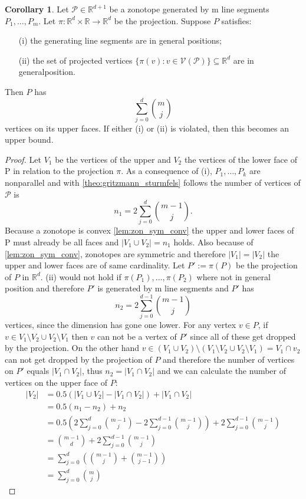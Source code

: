 \documentclass{article}
\theoremstyle{definition}
\newtheorem{corollary}[theorem]{Corollary}
\begin{document}
\begin{corollary}\hspace{1sp}\cite[p.~4]{zhang2018tropical}
\label{cor:zon_lines}
Let $\mathcal{P} \in \mathbb{R}^{d+1}$ be a zonotope generated by m line segments $P_1 , \dots , P_m$. Let $\pi : \mathbb{R}^{d} \times \mathbb{R} \to \mathbb{R}^{d}$ be the projection. Suppose $P$ satisfies:
\begin{itemize}
\item[(i)]
the generating line segments are in general positions;
\item[(ii)]
the set of projected vertices $\{ \pi(v) : v \in \mathcal{V}(\mathcal{P}) \} \subseteq \mathbb{R}^{d}$ are in generalposition.
\end{itemize}
Then $P$ has
$$ \sum_{j=0}^{d} \binom{m}{j} $$
vertices on its upper faces. If either (i) or (ii) is violated, then this becomes an upper bound.
\end{corollary}
\begin{proof}
Let $V_{1}$ be the vertices of the upper and $V_{2}$ the vertices of the lower face of P in relation to the projection $\pi$. As a consequence of (i), $P_{1}, \dots , P_{k}$ are nonparallel and with \ref{theo:gritzmann_sturmfels} follows the number of vertices of $\mathcal{P}$ is 
$$n_{1} = 2 \sum^{d}_{j=0} \binom{m-1}{j}.$$ 
Because a zonotope is convex \ref{lem:zon_sym_conv} the upper and lower faces of P must already be all faces and $|V_{1} \cup V_{2}| = n_{1}$ holds. Also because of \ref{lem:zon_sym_conv}, zonotopes are symmetric and therefore $|V_{1}| = |V_{2}|$ the upper and lower faces are of same cardinality. Let $P' := \pi (P)$ be the projection of $P$ in $\mathbb{R}^{d}$. (ii) would not hold if $\pi(P_{1}), \dots , \pi(P_{2})$ where not in general position and therefore $P'$ is generated by m line segments and $P'$ has 
$$n_{2}=2 \sum^{d-1}_{j=0} \binom{m-1}{j}$$
vertices, since the dimension has gone one lower. For any vertex $v \in P$, if $v \in V_{1} \setminus V_{2} \cup V_{2} \setminus V_{1}$ then $v$ can not be a vertex of $P'$ since all of these get dropped by the projection. On the other hand $v \in (V_{1} \cup V_{2}) \setminus (V_{1} \setminus V_{2} \cup V_{2} \setminus V_{1}) = V_{1} \cap v_{2}$ can not get dropped by the projection of $P$ and therefore the number of vertices on $P'$ equals $|V_{1} \cap V_{2}|$, thus $n_{2} = |V_{1} \cap V_{2}|$ and we can calculate the number of vertices on the upper face of $P$:
\begin{align*}
|V_{2}|
&= 0.5(|V_{1} \cup V_{2}| - |V_{1} \cap V_{2}|) + |V_{1} \cap V_{2}| \\
&= 0.5(n_{1} - n_{2}) + n_{2} \\
&= 0.5(2 \sum^{d}_{j=0} \binom{m-1}{j} - 2 \sum^{d-1}_{j=0} \binom{m-1}{j}) + 2 \sum^{d-1}_{j=0} \binom{m-1}{j} \\
&= \binom{m-1}{d} + 2 \sum^{d-1}_{j=0} \binom{m-1}{j} \\
&= \sum^{d}_{j=0}(\binom{m-1}{j} + \binom{m-1}{j-1}) \\
&= \sum^{d}_{j=0} \binom{m}{j}
\end{align*}
\end{proof}
\end{document}
